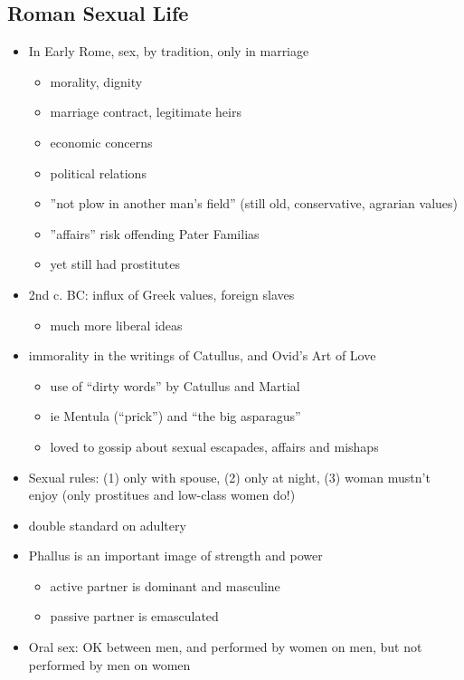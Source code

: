 \documentclass[12pt, twoside]{article}
\begin{document}
\subsection{Roman Sexual Life}
\begin{itemize}
\item In Early Rome, sex,  by tradition, only in marriage
	\begin{itemize}
	\item morality, dignity
	\item marriage contract, legitimate heirs
	\item economic concerns
	\item political relations
	\item ”not plow in another man’s field” (still      old, conservative, agrarian values)
	\item ”affairs” risk offending Pater Familias
	\item yet still had prostitutes	
	\end{itemize}
\item 2nd c. BC: influx of Greek values, foreign slaves
	\begin{itemize}
	\item much more liberal ideas
	\end{itemize}
\item immorality in the writings of Catullus, and Ovid’s  Art of Love
	\begin{itemize}
	\item use of “dirty words” by Catullus and Martial
	\item ie Mentula (“prick”) and “the big asparagus”
	\item loved to gossip about sexual escapades, affairs and mishaps
	\end{itemize}
\item Sexual rules: (1) only with spouse, (2) only at night, (3) woman mustn’t enjoy (only prostitues and low-class women do!)
\item double standard on adultery
\item Phallus is an important image of strength and power
	\begin{itemize}
	\item active partner is dominant and masculine
	\item passive partner is emasculated
	\end{itemize}
\item Oral sex: OK between men, and performed by women on men, but not performed by men on women
	\begin{itemize}

\end{itemize}
\end{itemize}
\end{document}
